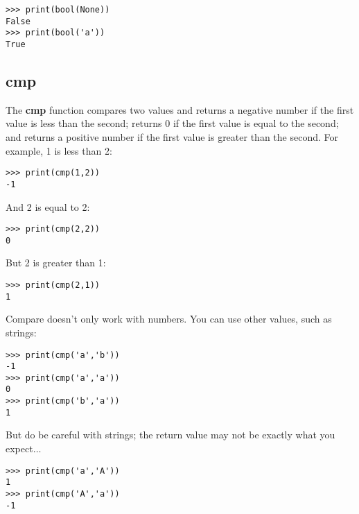 \begin{listing}
\begin{verbatim}
>>> print(bool(None))
False
>>> print(bool('a'))
True 
\end{verbatim}
\end{listing}

\subsection*{cmp}

The \textbf{cmp} function compares two values and returns a negative number if the first value is less than the second; returns 0 if the first value is equal to the second; and returns a positive number if the first value is greater than the second. For example, 1 is less than 2:

\begin{listing}
\begin{verbatim}
>>> print(cmp(1,2))
-1
\end{verbatim}
\end{listing}

\noindent
And 2 is equal to 2:

\begin{listing}
\begin{verbatim}
>>> print(cmp(2,2))
0
\end{verbatim}
\end{listing}

\noindent
But 2 is greater than 1:

\begin{listing}
\begin{verbatim}
>>> print(cmp(2,1))
1
\end{verbatim}
\end{listing}

\noindent
Compare doesn't only work with numbers. You can use other values, such as strings:

\begin{listing}
\begin{verbatim}
>>> print(cmp('a','b'))
-1
>>> print(cmp('a','a'))
0
>>> print(cmp('b','a'))
1
\end{verbatim}
\end{listing}

\noindent
But do be careful with strings; the return value may not be exactly what you expect$\ldots$

\begin{listing}
\begin{verbatim}
>>> print(cmp('a','A'))
1
>>> print(cmp('A','a'))
-1
\end{verbatim}
\end{listing}


